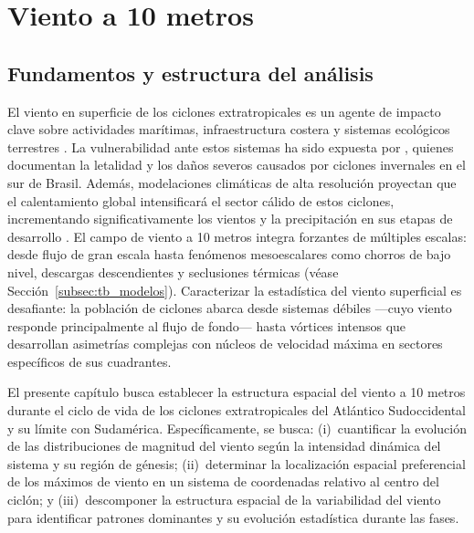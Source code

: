 \chapter{Viento a 10 metros}\label{cap:resultados_wind10}

\section{Fundamentos y estructura del análisis}\label{sec:intro_wind10}

El viento en superficie de los ciclones extratropicales es un agente de impacto clave sobre actividades marítimas, infraestructura costera y sistemas ecológicos terrestres \citep{gramcianinov2023impact}. 
La vulnerabilidad ante estos sistemas ha sido expuesta por \citet{bartolomei2024extremos}, quienes documentan la letalidad y los daños severos causados por ciclones invernales en el sur de Brasil. 
Además, modelaciones climáticas de alta resolución proyectan que el calentamiento global intensificará el sector cálido de estos ciclones, incrementando significativamente los vientos y la precipitación en sus etapas de desarrollo \citep{gentile2025response}. 
El campo de viento a 10 metros integra forzantes de múltiples escalas: desde flujo de gran escala hasta fenómenos mesoescalares como chorros de bajo nivel, descargas descendientes y seclusiones térmicas (véase Sección~\ref{subsec:tb_modelos}). 
Caracterizar la estadística del viento superficial es desafiante: la población de ciclones abarca desde sistemas débiles —cuyo viento responde principalmente al flujo de fondo— hasta vórtices intensos que desarrollan asimetrías complejas con núcleos de velocidad máxima en sectores específicos de sus cuadrantes.

El presente capítulo busca establecer la estructura espacial del viento a 10 metros durante el ciclo de vida de los ciclones extratropicales del Atlántico Sudoccidental y su límite con Sudamérica. 
Específicamente, se busca: (i)~cuantificar la evolución de las distribuciones de magnitud del viento según la intensidad dinámica del sistema y su región de génesis; (ii)~determinar la localización espacial preferencial de los máximos de viento en un sistema de coordenadas relativo al centro del ciclón; y (iii)~descomponer la estructura espacial de la variabilidad del viento para identificar patrones dominantes y su evolución estadística durante las fases.

